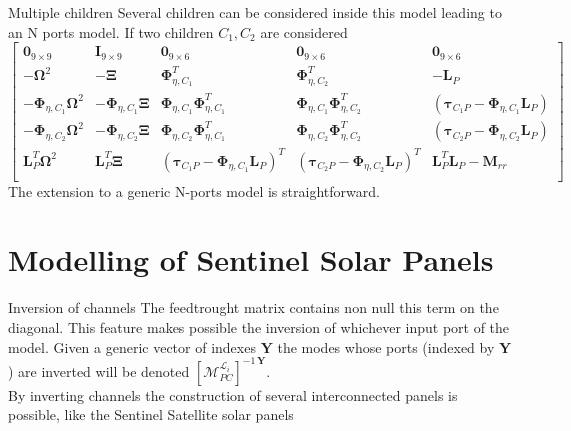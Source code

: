 \documentclass{beamer}
\begin{document}
\begin{frame}{Multiple children}
	Several children can be considered inside this model leading to an N ports model. If two children $C_1, C_2$ are considered
	\tiny{
		\begin{equation*}
		\left[
		\begin{array}{cc|ccc}
		\bm{0}_{9 \times 9} & \bm{I}_{9 \times 9} & \bm{0}_{9 \times 6} & \bm{0}_{9 \times 6} & \bm{0}_{9 \times 6}\\
		-\bm{\Omega}^2 & -\bm{\Xi}  & \bm\Phi_{\eta, C_1}^T & \bm\Phi_{\eta, C_2}^T & -\bm{L}_P  \\
		\hline
		-\bm\Phi_{\eta, C_1}\bm{\Omega}^2 & -\bm\Phi_{\eta, C_1}\bm{\Xi} &  \bm\Phi_{\eta, C_1}  \bm\Phi_{\eta, C_1}^T &  \bm\Phi_{\eta, C_1}  \bm\Phi_{\eta, C_2}^T & \left(\bm{\tau}_{C_1 P} - \bm\Phi_{\eta, C_1} \bm{L}_P \right)  \\
		-\bm\Phi_{\eta, C_2}\bm{\Omega}^2 & -\bm\Phi_{\eta, C_2}\bm{\Xi} &  \bm\Phi_{\eta, C_2}  \bm\Phi_{\eta, C_1}^T &  \bm\Phi_{\eta, C_2}  \bm\Phi_{\eta, C_2}^T  & \left(\bm{\tau}_{C_2 P} - \bm\Phi_{\eta, C_2} \bm{L}_P \right)  \\
		\bm{L}_P^T \bm{\Omega}^2 & \bm{L}_P^T \bm{\Xi} &  \left(\bm{\tau}_{C_1 P} - \bm\Phi_{\eta, C_1} \bm{L}_P \right)^T &  \left(\bm{\tau}_{C_2 P} - \bm\Phi_{\eta, C_2} \bm{L}_P \right)^T & \bm{L}_P^T \bm{L}_P - \bm{M}_{rr} \\	
		\end{array}
		\right]	
		\end{equation*}
	}
\normalsize
The extension to a generic N-ports model is straightforward.
\end{frame}

\section{Modelling of Sentinel Solar Panels}

\begin{frame}{Inversion of channels}
	The feedtrought matrix contains non null this term on the diagonal. This feature makes possible the inversion of whichever input port of the model. Given a generic vector of indexes $\bm{Y}$ the modes whose ports (indexed by $\bm{Y}$) are inverted will be denoted $\left[ \mathcal{M}_{PC}^{\mathcal{L}_i} \right]^{-1\, \bm{Y}}$. \\
	
	By inverting channels the construction of several interconnected panels is possible, like the Sentinel Satellite solar panels
\end{frame}
\end{document}
